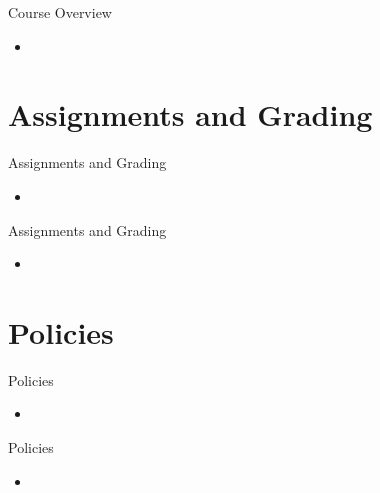 \documentclass{beamer}
\begin{document}
\begin{frame}{Course Overview}
    \begin{itemize}
        \item 
    \end{itemize}
\end{frame}

\section{Assignments and Grading}
\begin{frame}{Assignments and Grading}
    \begin{itemize}
        \item
    \end{itemize}
\end{frame}     

\begin{frame}{Assignments and Grading}
    \begin{itemize}
        \item
    \end{itemize}
\end{frame}

\section{Policies}
\begin{frame}{Policies}
    \begin{itemize}
        \item
    \end{itemize}
\end{frame}

\begin{frame}{Policies}
    \begin{itemize}
        \item
    \end{itemize}
\end{frame}


\end{document}
